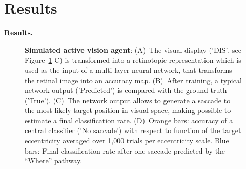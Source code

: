 \CNS
\section{Results}
\label{sec:results}
\else
\textbf{Results. }
\fi
\begin{figure}%
\caption{
{\bf Simulated active vision agent}: 
(A)~The visual display ('DIS', see  Figure~\ref{fig:results}-C)  is transformed into a retinotopic representation which is used as the input of a multi-layer neural network, that transforms the retinal image into an accuracy map. (B)~After training, a typical network output  ('Predicted') is compared  with the ground truth ('True'). (C)~The network output allows to generate a saccade to the most likely target position in visual space, making possible to estimate a final classification rate. (D)~Orange bars: accuracy of a central classifier ('No saccade') with respect to  function of the target eccentricity averaged over 1,000 trials per eccentricity scale. Blue bars: Final classification rate after one saccade predicted by the ``Where'' pathway.
\label{fig:results}}%
\end{figure}%

